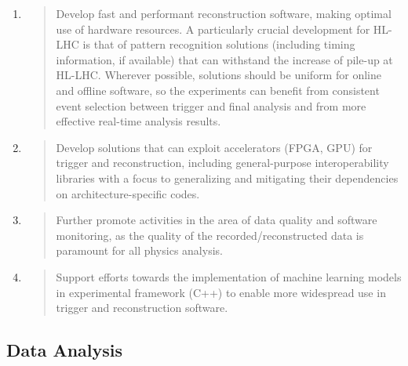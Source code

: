 \documentclass[10pt,a4paper]{article}
\begin{document}
\begin{enumerate}
\def\labelenumi{\arabic{enumi}.}
\item
  \begin{quote}
  Develop fast and performant reconstruction software, making optimal
  use of hardware resources. A particularly crucial development for
  HL-LHC is that of pattern recognition solutions (including timing
  information, if available) that can withstand the increase of pile-up
  at HL-LHC. Wherever possible, solutions should be uniform for online
  and offline software, so the experiments can benefit from consistent
  event selection between trigger and final analysis and from more
  effective real-time analysis results.
  \end{quote}
\item
  \begin{quote}
  Develop solutions that can exploit accelerators (FPGA, GPU) for
  trigger and reconstruction, including general-purpose interoperability
  libraries with a focus to generalizing and mitigating their
  dependencies on architecture-specific codes.
  \end{quote}
\item
  \begin{quote}
  Further promote activities in the area of data quality and software
  monitoring, as the quality of the recorded/reconstructed data is
  paramount for all physics analysis.
  \end{quote}
\item
  \begin{quote}
  Support efforts towards the implementation of machine learning models
  in experimental framework (C++) to enable more widespread use in
  trigger and reconstruction software.
  \end{quote}
\end{enumerate}

\hypertarget{data-analysis-1}{%
\subsection{Data Analysis}\label{data-analysis-1}}
\end{document}
